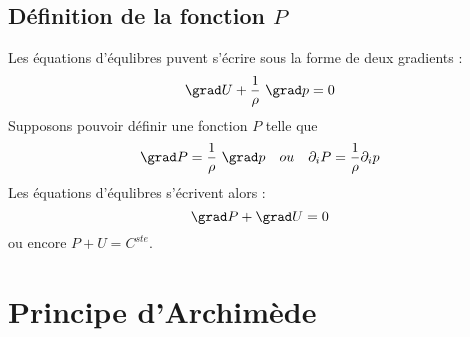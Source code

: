 	\subsection{Définition de la fonction $P$}
	Les équations d'équlibres puvent s'écrire sous la forme de deux gradients :
	\begin{equation}
	\grad U + \dfrac{1}{\rho}\ \grad p = 0
	\end{equation}
	Supposons pouvoir définir une fonction $P$ telle que
	\begin{equation}
	\grad P = \dfrac{1}{\rho}\ \grad p\ \ \ ou\ \ \ \partial_iP = \dfrac{1}{\rho}
	\partial_i p
	\end{equation}
	Les équations d'équlibres s'écrivent alors :
	\begin{equation}
	\grad P + \grad U = 0
	\end{equation}
	ou encore $P + U = C^{ste}$.
	
	
\section{Principe d'Archimède}
